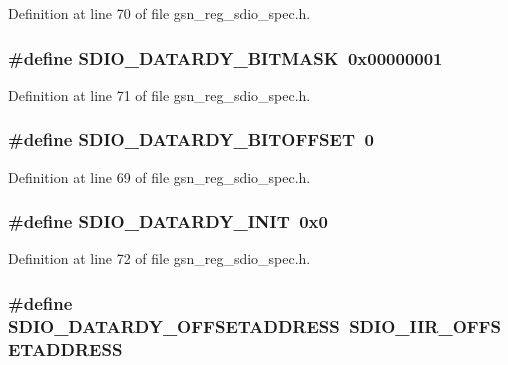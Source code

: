 Definition at line 70 of file gsn\_\-reg\_\-sdio\_\-spec.h.

\hypertarget{a00571_aa00229db511f3857971bfc6db6e9fb96}{
\subsubsection[{SDIO\_\-DATARDY\_\-BITMASK}]{\setlength{\rightskip}{0pt plus 5cm}\#define SDIO\_\-DATARDY\_\-BITMASK~0x00000001}}
\label{a00571_aa00229db511f3857971bfc6db6e9fb96}


Definition at line 71 of file gsn\_\-reg\_\-sdio\_\-spec.h.

\hypertarget{a00571_a79425bcf8495719ae8a6672273350fae}{
\subsubsection[{SDIO\_\-DATARDY\_\-BITOFFSET}]{\setlength{\rightskip}{0pt plus 5cm}\#define SDIO\_\-DATARDY\_\-BITOFFSET~0}}
\label{a00571_a79425bcf8495719ae8a6672273350fae}


Definition at line 69 of file gsn\_\-reg\_\-sdio\_\-spec.h.

\hypertarget{a00571_afd5f873115191c6ec12001d93d5f4b12}{
\subsubsection[{SDIO\_\-DATARDY\_\-INIT}]{\setlength{\rightskip}{0pt plus 5cm}\#define SDIO\_\-DATARDY\_\-INIT~0x0}}
\label{a00571_afd5f873115191c6ec12001d93d5f4b12}


Definition at line 72 of file gsn\_\-reg\_\-sdio\_\-spec.h.

\hypertarget{a00571_a5b3ce86b644f25167db2a76513c4bb0a}{
\subsubsection[{SDIO\_\-DATARDY\_\-OFFSETADDRESS}]{\setlength{\rightskip}{0pt plus 5cm}\#define SDIO\_\-DATARDY\_\-OFFSETADDRESS~SDIO\_\-IIR\_\-OFFSETADDRESS}}
\label{a00571_a5b3ce86b644f25167db2a76513c4bb0a}


